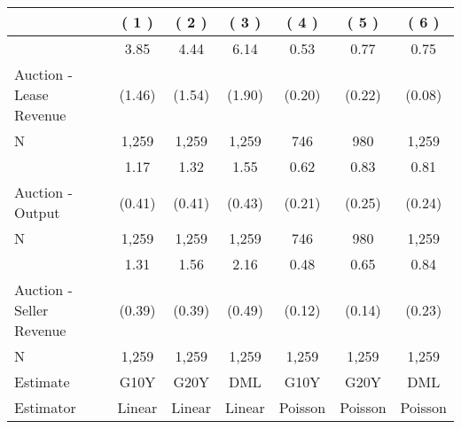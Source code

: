 
\begin{tabular}{lcccccc}
\toprule
  & ( 1 ) & ( 2 ) & ( 3 ) & ( 4 ) & ( 5 ) & ( 6 )\\
\midrule
 & 3.85 & 4.44 & 6.14 & 0.53 & 0.77 & 0.75\\

\multirow{-2}{*}{\raggedright\arraybackslash Auction - Lease Revenue} & (1.46) & (1.54) & (1.90) & (0.20) & (0.22) & (0.08)\\

N & 1,259 & 1,259 & 1,259 & 746 & 980 & \vphantom{1} 1,259\\

\midrule
 & 1.17 & 1.32 & 1.55 & 0.62 & 0.83 & 0.81\\

\multirow{-2}{*}{\raggedright\arraybackslash Auction - Output} & (0.41) & (0.41) & (0.43) & (0.21) & (0.25) & (0.24)\\

N & 1,259 & 1,259 & 1,259 & 746 & 980 & 1,259\\

\midrule
 & 1.31 & 1.56 & 2.16 & 0.48 & 0.65 & 0.84\\

\multirow{-2}{*}{\raggedright\arraybackslash Auction - Seller Revenue} & (0.39) & (0.39) & (0.49) & (0.12) & (0.14) & (0.23)\\

N & 1,259 & 1,259 & 1,259 & 1,259 & 1,259 & 1,259\\

\midrule
Estimate & G10Y & G20Y & DML & G10Y & G20Y & DML\\

Estimator & Linear & Linear & Linear & Poisson & Poisson & Poisson\\
\bottomrule
\end{tabular}
